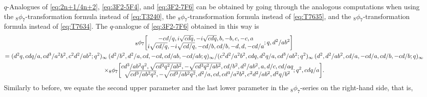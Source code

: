 \documentclass[12pt,reqno]{amsart}
\begin{document}
$q$-Analogues of \eqref{eq:2n+1/4n+2}, \eqref{eq:3F2-5F4}, and \eqref{eq:3F2-7F6} can be
obtained by going through the analogous computations when using 
the $_8\phi_7$-transformation formula \cite[Eq.~(3.5.10)]{GR04} 
instead of \eqref{eq:T3240}, the $_8\phi_7$-transformation formula
\cite[Appendix (III.24)]{GR04} instead of \eqref{eq:T7635},
and the $_8\phi_7$-transformation formula \cite[Eq.~(2.10.1)]{GR04} 
instead of \eqref{eq:T7634}. The $q$-analogue of
\eqref{eq:3F2-7F6} obtained in this way is
\begin{multline} \label{eq:3F2-7F6Q}
{} _{8} \phi _{7} \biggl[ \begin{matrix} 
\def\frac#1#2{#1 / #2}  -cd/q, i \sqrt{c d q}, -i
   \sqrt{c d q}, b, -b, c, -c, a
\\
i\sqrt{c d/q},
    -i\sqrt{c d/q}, -c d/b, c d/b, -d, d,
    -c d/a
\end{matrix} ; q,
   \frac {d^2} {ab^2}\biggr] 
\\
=\frac {\def\frac#1#2{#1 / #2}  
(d^2 q, \frac{c d q}{a}, \frac{c d^3}{a^2
    b^2},
                     \frac{c^2 d^2}{a b^2};
                     q^2)_\infty\,
            (\frac{d^2}{b^2}, \frac{d^2}{a},
                     c d, -c d, \frac{c d}{a b},
                     -\frac{c d}{a b};
                     q)_\infty}
    {\def\frac#1#2{#1 / #2}  
(\frac{c^2 d^2}{a^2
                     b^2}, c d q, \frac{d^2 q}{a},
                   \frac{c d^3}{a b^2};
                     q^2)_\infty
\,
(d^2, \frac{d^2}{a b^2}, \frac{c
                     d}{a}, -\frac{c d}{a}, \frac{c
                     d}{b}, -\frac{c
                     d}{b}; q)_\infty}
\\
\times
{} _{8} \phi _{7} \biggl[ \begin{matrix} 
\def\frac#1#2{#1 / #2} 
\frac{c d^3}{a b^2 q^2}, \sqrt{\frac{c d^3 q^2}{a b^2 }},
                     - \sqrt{\frac{c d^3 q^2}{a b^2 }},
                     \frac{c d}{b^2},
                     \frac{d^2}{a b^2}, a,
                     \frac{d}{c}, \frac{c d}{a q}\\
\def\frac#1#2{#1 / #2} 
\sqrt{\frac{c d^3 }{a b^2 q^2}}, - \sqrt{\frac{c d^3 }{a b^2 q^2}},
 \frac{d^2}{a}, c d,
                   \frac{c d^3}{a^2 b^2},
                     \frac{c^2 d^2}{a b^2}, \frac{d^2 q}{b^2}
\end{matrix} ; q^2,
   \frac {cdq} {a}\biggr] . 
\end{multline}
Similarly to before, we equate the second upper parameter and the
last lower parameter in the $_8\phi_7$-series on the right-hand side,
that is, 
\end{document}
